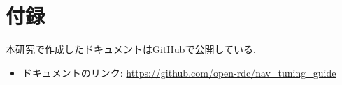 \chapter*{付録}

本研究で作成したドキュメントはGitHubで公開している. 

\begin{itemize}
  \item ドキュメントのリンク: \url{https://github.com/open-rdc/nav_tuning_guide}
\end{itemize}

